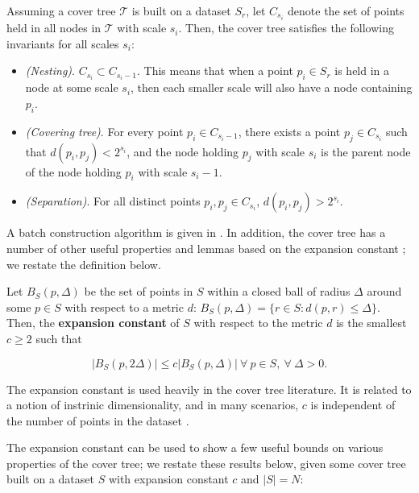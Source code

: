 Assuming a cover tree $\mathscr{T}$ is built on a dataset $S_r$, let $C_{s_i}$
denote the set of points held in all nodes in $\mathscr{T}$ with scale $s_i$.
Then, the cover tree satisfies the following invariants for all scales $s_i$:

\begin{itemize}

\item {\em (Nesting)}.  $C_{s_i} \subset C_{s_i - 1}$.  This means that when a
point $p_i \in S_r$ is held in a node at some scale $s_i$, then each smaller
scale will also have a node containing $p_i$.

\item {\em (Covering tree)}.  For every point $p_i \in C_{s_i - 1}$, there
exists a point $p_j \in C_{s_i}$ such that $d(p_i, p_j) < 2^{s_i}$, and the node
holding $p_j$ with scale $s_i$ is the parent node of the node holding $p_i$ with
scale $s_i - 1$.

\item {\em (Separation)}.  For all distinct points $p_i, p_j \in C_{s_i}$,
$d(p_i, p_j) > 2^{s_i}$.

\end{itemize}

A batch construction algorithm is given in \cite{langford2006}.  In addition,
the cover tree has a number of other useful properties and lemmas based on the
expansion constant \cite{karger2002finding}; we restate the definition below.

\begin{defn}
\label{def:int_dim}
Let $B_S(p, \Delta)$ be the set of points in $S$ within a closed ball of radius
$\Delta$ around some $p \in S$ with respect to a metric $d$:
%
$B_S(p, \Delta) = \{ r \in S \colon d(p, r) \leq \Delta \}$.
%
Then, the {\bf expansion constant} of $S$ with respect to the metric $d$ is the
smallest $c \ge 2$ such that

\begin{equation}
| B_S(p, 2 \Delta) | \le c | B_S(p, \Delta) |\ \forall\ p \in S,\
\forall\ \Delta > 0.
\end{equation}

\end{defn}

The expansion constant is used heavily in the cover tree literature.  It is
related to a notion of instrinic dimensionality, and in many scenarios, $c$ is
independent of the number of points in the dataset \cite{langford2006,
karger2002finding}.

The expansion constant can be used to show a few useful bounds on various
properties of the cover tree; we restate these results below, given some cover
tree built on a dataset $S$ with expansion constant $c$ and $|S| = N$:

